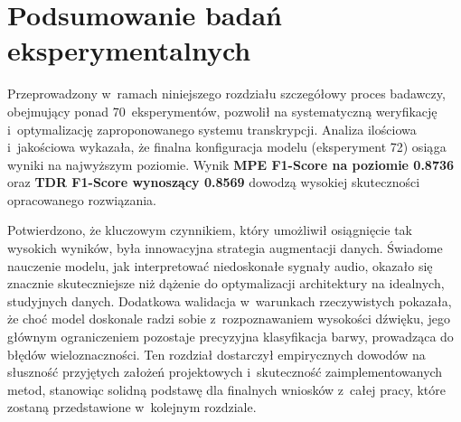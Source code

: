 \section{Podsumowanie badań eksperymentalnych}
\label{sec:podsumowanie_badan}

Przeprowadzony w~ramach niniejszego rozdziału szczegółowy proces badawczy, obejmujący ponad 70~eksperymentów, pozwolił na systematyczną weryfikację i~optymalizację zaproponowanego systemu transkrypcji. Analiza ilościowa i~jakościowa wykazała, że finalna konfiguracja modelu (eksperyment 72) osiąga wyniki na najwyższym poziomie. Wynik \textbf{MPE F1-Score na poziomie 0.8736} oraz \textbf{TDR F1-Score wynoszący 0.8569} dowodzą wysokiej skuteczności opracowanego rozwiązania.

Potwierdzono, że kluczowym czynnikiem, który umożliwił osiągnięcie tak wysokich wyników, była innowacyjna strategia augmentacji danych. Świadome nauczenie modelu, jak interpretować niedoskonałe sygnały audio, okazało się znacznie skuteczniejsze niż dążenie do optymalizacji architektury na idealnych, studyjnych danych. Dodatkowa walidacja w~warunkach rzeczywistych pokazała, że choć model doskonale radzi sobie z~rozpoznawaniem wysokości dźwięku, jego głównym ograniczeniem pozostaje precyzyjna klasyfikacja barwy, prowadząca do błędów wieloznaczności. Ten rozdział dostarczył empirycznych dowodów na słuszność przyjętych założeń projektowych i~skuteczność zaimplementowanych metod, stanowiąc solidną podstawę dla finalnych wniosków z~całej pracy, które zostaną przedstawione w~kolejnym rozdziale.